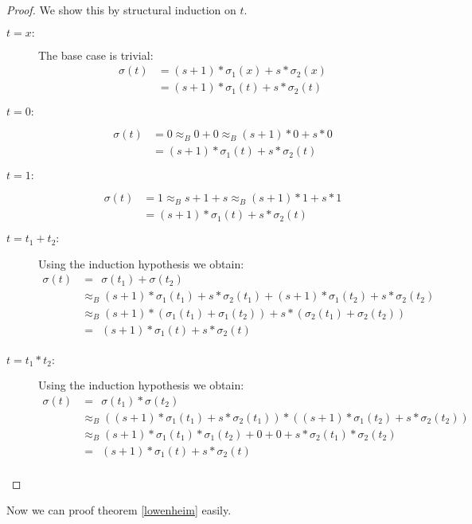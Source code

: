 		\begin{proof}
		We show this by structural induction on $t$.
		\begin{description}
		\item[$t=x:$]The base case is trivial:
				\begin{align*}
				\sigma(t)&=(s+1)*\sigma_1(x)+s*\sigma_2(x)\\
				&=(s+1)*\sigma_1(t)+s*\sigma_2(t)
				\end{align*}
		\item[$t=0:$]
				\begin{align*}
				\sigma(t)&=0
				\approx_B0+0
				\approx_B(s+1)*0+s*0\\
				&=(s+1)*\sigma_1(t)+s*\sigma_2(t)
				\end{align*}
		\item[$t=1:$]
				\begin{align*}
				\sigma(t)&=1
				\approx_Bs+1+s
				\approx_B(s+1)*1+s*1\\
				&=(s+1)*\sigma_1(t)+s*\sigma_2(t)
				\end{align*}
		\item[$t=t_1+t_2:$]Using the induction hypothesis we obtain:
				\begin{align*}
				\sigma(t)&=\ \ \sigma(t_1)+\sigma(t_2)\\
				&\approx_B(s+1)*\sigma_1(t_1)+s*\sigma_2(t_1)+(s+1)*\sigma_1(t_2)+s*\sigma_2(t_2)\\
				&\approx_B(s+1)*(\sigma_1(t_1)+\sigma_1(t_2))+s*(\sigma_2(t_1)+\sigma_2(t_2))\\
				&=\ \ (s+1)*\sigma_1(t)+s*\sigma_2(t)\\
				\end{align*}
		\item[$t=t_1*t_2:$]Using the induction hypothesis we obtain:
				\begin{align*}
				\sigma(t)&=\ \ \sigma(t_1)*\sigma(t_2)\\
				&\approx_B((s+1)*\sigma_1(t_1)+s*\sigma_2(t_1))*((s+1)*\sigma_1(t_2)+s*\sigma_2(t_2))\\
				&\approx_B(s+1)*\sigma_1(t_1)*\sigma_1(t_2)+0+0+s*\sigma_2(t_1)*\sigma_2(t_2)\\
				&=\ \ (s+1)*\sigma_1(t)+s*\sigma_2(t)\\
				\end{align*}
		\end{description}
		\end{proof}
		Now we can proof theorem \ref{lowenheim} easily.
